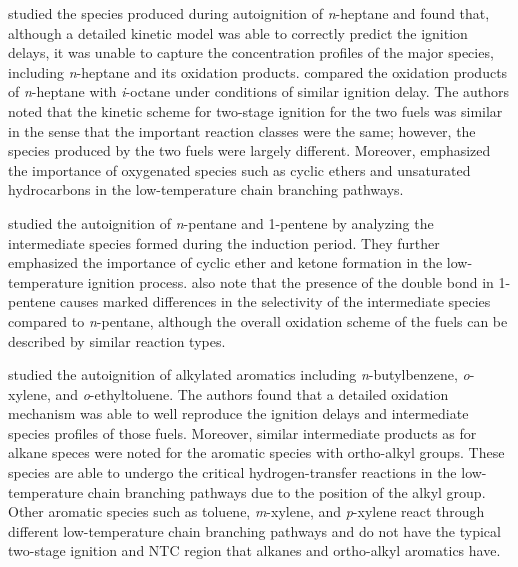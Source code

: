 \documentclass[../main.tex]{subfiles}
\begin{document}
\textcite{Minetti1995} studied the species produced during autoignition
of \textit{n}-heptane and found that, although a detailed kinetic model
was able to correctly predict the ignition delays, it was unable to
capture the concentration profiles of the major species, including
\textit{n}-heptane and its oxidation products. \textcite{Minetti1996}
compared the oxidation products of \textit{n}-heptane with
\textit{i}-octane under conditions of similar ignition delay. The
authors noted that the kinetic scheme for two-stage ignition for the
two fuels was similar in the sense that the important reaction classes
were the same; however, the species produced by the two fuels were
largely different. Moreover, \textcite{Minetti1996} emphasized the importance
of oxygenated species such as cyclic ethers and unsaturated hydrocarbons
in the low-temperature chain branching pathways.

\textcite{Ribaucour1998, Minetti1999} studied the autoignition of
\textit{n}-pentane and 1-pentene by analyzing the intermediate species
formed during the induction period. They further emphasized the importance
of cyclic ether and ketone formation in the low-temperature ignition process.
\textcite{Ribaucour1998, Minetti1999} also note that the presence of the
double bond in 1-pentene causes marked differences in the selectivity of
the intermediate species compared to \textit{n}-pentane, although the
overall oxidation scheme of the fuels can be described by similar reaction types.

\textcite{Ribaucour2000a, Roubaud2000a} studied the autoignition of alkylated
aromatics including \textit{n}-butylbenzene, \textit{o}-xylene, and
\textit{o}-ethyltoluene. The authors found that a detailed oxidation
mechanism was able to well reproduce the ignition delays and intermediate
species profiles of those fuels. Moreover, similar intermediate products
as for alkane speces were noted for the aromatic species with ortho-alkyl
groups. These species are able to undergo the critical hydrogen-transfer
reactions in the low-temperature chain branching pathways due to the position
of the alkyl group. Other aromatic species such as toluene, \textit{m}-xylene,
and \textit{p}-xylene react through different low-temperature chain branching
pathways and do not have the typical two-stage ignition and NTC region
that alkanes and ortho-alkyl aromatics have.
\end{document}
